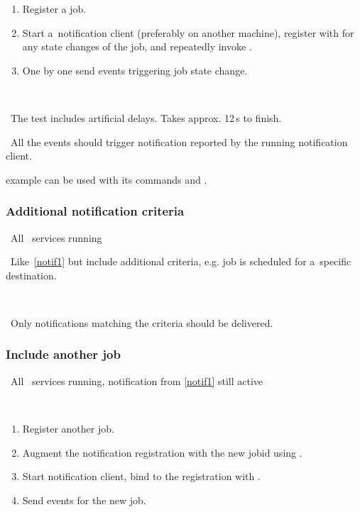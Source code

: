 \what
\begin{enumerate}
\item Register a job.
\item Start a~notification client (preferably on another machine),
register with  for any state changes of the job,
and repeatedly invoke .
\item One by one send events triggering job state change.
\end{enumerate}

\how\ 

\note\ The test includes artificial delays. Takes approx. 12\,s to finish.

\result\ All the events should trigger notification reported by the running
notification client.

\begin{hints}
 example can be used with its commands  and .
\end{hints}



\subsubsection{Additional notification criteria}
\label{notif-complex}
\req\ All \LB\ services running

\what\ Like~\ref{notif1} but include additional criteria,
e.g. job is scheduled for a~specific destination.

\how\ 

\result\ Only notifications matching the criteria should be delivered.




\subsubsection{Include another job}
\label{notif2}
\req\ All \LB\ services running, notification from \ref{notif1} still active

\how\
\begin{enumerate}
\item Register another job.
\item Augment the notification registration with the new jobid using
\code{edg\_wll\_NotifChange}.
\item Start notification client, bind to the registration with
.
\item Send events for the new job.
\end{enumerate}

